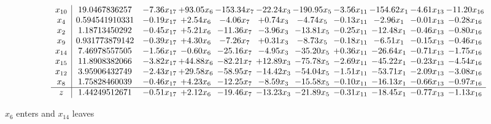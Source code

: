 \documentclass[9pt]{article}
\begin{document}
 \[\begin{array}{c| c c@{\hskip 2pt} c@{\hskip 2pt} c@{\hskip 2pt} c@{\hskip 2pt} c@{\hskip 2pt} c@{\hskip 2pt} c@{\hskip 2pt} c@{\hskip 2pt} c@{\hskip 2pt} }
 x_{10}   &  19.0467836257 & -7.36 x_{17} & + 93.05 x_{6} & -153.34 x_{7} & -22.24 x_{3} & -190.95 x_{5} & -3.56 x_{11} & -154.62 x_{1} & -4.61 x_{13} & -11.20 x_{16}\\
 x_{4}   &  0.594541910331 & -0.19 x_{17} & +  2.54 x_{6} & -4.06 x_{7} & +  0.74 x_{3} & -4.74 x_{5} & -0.13 x_{11} & -2.96 x_{1} & -0.01 x_{13} & -0.28 x_{16}\\
 x_{2}   &  1.18713450292 & -0.45 x_{17} & +  5.21 x_{6} & -11.36 x_{7} & -3.96 x_{3} & -13.81 x_{5} & -0.25 x_{11} & -12.48 x_{1} & -0.46 x_{13} & -0.80 x_{16}\\
 x_{9}   &  0.931773879142 & -0.39 x_{17} & +  4.30 x_{6} & -7.26 x_{7} & +  0.31 x_{3} & -8.73 x_{5} & -0.18 x_{11} & -6.51 x_{1} & -0.15 x_{13} & -0.46 x_{16}\\
 x_{14}   &  7.46978557505 & -1.56 x_{17} & -0.60 x_{6} & -25.16 x_{7} & -4.95 x_{3} & -35.20 x_{5} & +  0.36 x_{11} & -26.64 x_{1} & -0.71 x_{13} & -1.75 x_{16}\\
 x_{15}   &  11.8908382066 & -3.82 x_{17} & + 44.88 x_{6} & -82.21 x_{7} & + 12.89 x_{3} & -75.78 x_{5} & -2.69 x_{11} & -45.22 x_{1} & -0.23 x_{13} & -4.54 x_{16}\\
 x_{12}   &  3.95906432749 & -2.43 x_{17} & + 29.58 x_{6} & -58.95 x_{7} & -14.42 x_{3} & -54.04 x_{5} & -1.51 x_{11} & -53.71 x_{1} & -2.09 x_{13} & -3.08 x_{16}\\
 x_{8}   &  1.75828460039 & -0.46 x_{17} & +  4.23 x_{6} & -12.25 x_{7} & -8.59 x_{3} & -15.58 x_{5} & -0.10 x_{11} & -16.13 x_{1} & -0.66 x_{13} & -0.97 x_{16}\\
\hline
z    &  1.44249512671 & -0.51 x_{17} & +  2.12 x_{6} & -19.46 x_{7} & -13.23 x_{3} & -21.89 x_{5} & -0.31 x_{11} & -18.45 x_{1} & -0.77 x_{13} & -1.13 x_{16}\\
\end{array}\]


 $ x_{6} $ enters and $ x_{14} $ leaves 
\end{document}
